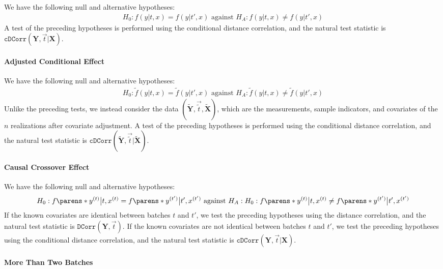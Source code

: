 We have the following null and alternative hypotheses:
\begin{align*}
    H_0: f(y|t,x) = f(y|t',x) \text{ against }H_A: f(y|t,x) \neq f(y|t',x)
\end{align*}
A test of the preceding hypotheses is performed using the conditional distance correlation, and the natural test statistic is $\texttt{cDCorr}(\mathbf Y, \vec t | \mathbf X)$. 

\paragraph{Adjusted Conditional Effect}

We have the following null and alternative hypotheses:
\begin{align*}
    H_0: \tilde f(y|t,x) = \tilde f(y|t',x) \text{ against }H_A: \tilde f(y|t,x) \neq \tilde f(y|t',x)
\end{align*}
Unlike the preceding tests, we instead consider the data $(\tilde {\mathbf Y}, \vec{\tilde t}, \tilde {\mathbf X})$, which are the measurements, sample indicators, and covariates of the $n$ realizations after covariate adjustment. A test of the preceding hypotheses is performed using the conditional distance correlation, and the natural test statistic is $\texttt{cDCorr}(\mathbf {\tilde Y}, \vec {\tilde t} | \mathbf {\tilde X})$. 

\paragraph{Causal Crossover Effect}

We have the following null and alternative hypotheses:
\begin{align*}
    H_0: f\parens*{y^{(t)} \big | t, x^{(t)}} = f\parens*{y^{(t')} \big | t', x^{(t')}}\text{ against }H_A: H_0: f\parens*{y^{(t)} \big | t, x^{(t)}} \neq f\parens*{y^{(t')} \big | t', x^{(t')}}
\end{align*}
If the known covariates are identical between batches $t$ and $t'$, we test the preceding hypotheses using the distance correlation, and the natural test statistic is $\texttt{DCorr}(\mathbf Y, \vec t)$. If the known covariates are not identical between batches $t$ and $t'$, we test the preceding hypotheses using the conditional distance correlation, and the natural test statistic is $\texttt{cDCorr}(\mathbf Y, \vec t | \mathbf X)$.

\paragraph{More Than Two Batches}

